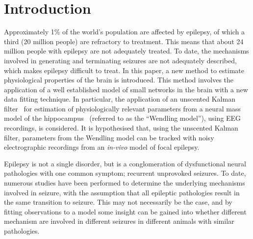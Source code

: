 \section{Introduction}


Approximately 1\% of the world's population are affected by epilepsy, of which a third (20 million people) are refractory to treatment. This means that about 24 million people with epilepsy are not adequately treated. To date, the mechanisms involved in generating and terminating seizures are not adequately described, which makes epilepsy difficult to treat. In this paper, a new method to estimate physiological properties of the brain is introduced. This method involves the application of a well established model of small networks in the brain with a new data fitting technique. In particular, the application of an unscented Kalman filter~\citep{voss2004nonlinear} for estimation of physiologically relevant parameters from a neural mass model of the hippocampus~\citep{wendling2002epileptic} (referred to as the ``Wendling model''), using EEG recordings, is considered. It is hypothesised that, using the unscented Kalman filter, parameters from the Wendling model can be tracked with noisy electrographic recordings from an \textsl{in-vivo} model of focal epilepsy.

Epilepsy is not a single disorder, but is a conglomeration of dysfunctional neural pathologies with one common symptom; recurrent unprovoked seizures. To date, numerous studies have been performed to determine the underlying mechanisms involved in seizure, with the assumption that all epileptic pathologies result in the same transition to seizure. This may not necessarily be the case, and by fitting observations to a model some insight can be gained into whether different mechanism are involved in different seizures in different animals with similar pathologies. 



